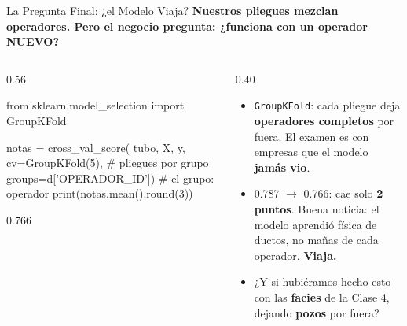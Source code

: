 \documentclass[aspectratio=169, 11pt]{beamer}
\begin{document}
\begin{frame}[fragile,shrink=26]{La Pregunta Final: ¿el Modelo Viaja?}
  \vspace{-4pt}
  {\small\color{arcaDark}\bfseries
    Nuestros pliegues mezclan operadores. Pero el negocio pregunta: ¿funciona con un operador NUEVO?}

  \vspace{4pt}
  \begin{columns}[T]
    \begin{column}{0.56\textwidth}
      \begin{pyblock}
from sklearn.model_selection import GroupKFold

notas = cross_val_score(
    tubo, X, y,
    cv=GroupKFold(5),          # pliegues por grupo
    groups=d['OPERADOR_ID'])   # el grupo: operador
print(notas.mean().round(3))
      \end{pyblock}
      \vspace{2pt}
      \begin{outputblock}
0.766
      \end{outputblock}
    \end{column}
    \begin{column}{0.40\textwidth}
      {\scriptsize\color{textMuted}
      \begin{itemize}\setlength{\itemsep}{5pt}
        \item[{\color{arcaRed}\scriptsize\faUsers}]
          \texttt{GroupKFold}: cada pliegue deja \textbf{operadores
          completos} por fuera. El examen es con empresas
          que el modelo \textbf{jamás vio}.
        \item[{\color{codeGreen}\scriptsize\faCheck}]
          0.787 \(\to\) 0.766: cae solo \textbf{2 puntos}.
          Buena noticia: el modelo aprendió física de ductos,
          no mañas de cada operador. \textbf{Viaja.}
        \item[{\color{arcaRed}\scriptsize\faQuestionCircle}]
          ¿Y si hubiéramos hecho esto con las \textbf{facies}
          de la Clase 4, dejando \textbf{pozos} por fuera?
      \end{itemize}
      }
    \end{column}
  \end{columns}
\end{frame}
\end{document}
